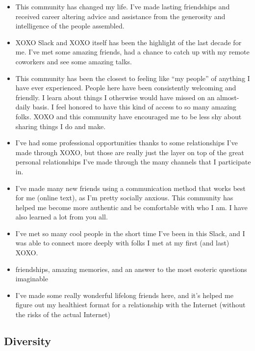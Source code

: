 \documentclass[
]{book}
\providecommand{\tightlist}{%
  \setlength{\itemsep}{0pt}\setlength{\parskip}{0pt}}
\begin{document}
\begin{itemize}
\tightlist
\item
  This community has changed my life. I've made lasting friendships and received career altering advice and assistance from the generosity and intelligence of the people assembled.
\item
  XOXO Slack and XOXO itself has been the highlight of the last decade for me. I've met some amazing friends, had a chance to catch up with my remote coworkers and see some amazing talks.
\item
  This community has been the closest to feeling like ``my people'' of anything I have ever experienced. People here have been consistently welcoming and friendly. I learn about things I otherwise would have missed on an almost-daily basis. I feel honored to have this kind of access to so many amazing folks. XOXO and this community have encouraged me to be less shy about sharing things I do and make.
\item
  I've had some professional opportunities thanks to some relationships I've made through XOXO, but those are really just the layer on top of the great personal relationships I've made through the many channels that I participate in.
\item
  I've made many new friends using a communication method that works best for me (online text), as I'm pretty socially anxious. This community has helped me become more authentic and be comfortable with who I am. I have also learned a lot from you all.
\item
  I've met so many cool people in the short time I've been in this Slack, and I was able to connect more deeply with folks I met at my first (and last) XOXO.
\item
  friendships, amazing memories, and an answer to the most esoteric questions imaginable
\item
  I've made some really wonderful lifelong friends here, and it's helped me figure out my healthiest format for a relationship with the Internet (without the risks of the actual Internet)
\end{itemize}

\subsection{Diversity}\label{diversity}
\end{document}
